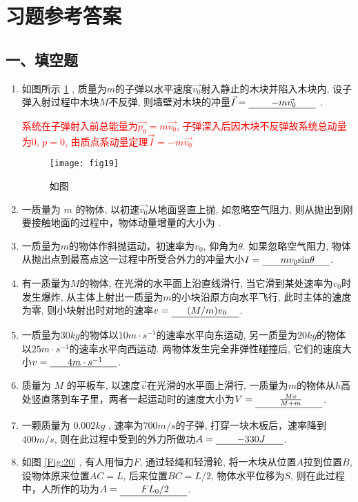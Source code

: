 \begin{enumerate}
\end{enumerate}

\section{习题参考答案}
\subsection*{一、填空题}
\begin{enumerate}
    \item 如图所示 \ref{Fig:19} , 质量为$m$的子弹以水平速度$\vec{v_0}$射入静止的木块并陷入木块内, 
    设子弹入射过程中木块$M$不反弹, 则墙壁对木块的冲量$\vec{I}=\anl{$-m\vec{v_0}$}$ .
    \begin{note}
        \textcolor{red}{系统在子弹射入前总能量为$\vec{p_0}=m\vec{v_0}$, 子弹深入后因木块不反弹故系统总动量为0, $p=0$, 由质点系动量定理$\vec{I}=-m\vec{v_0}$}
    \end{note}
    \begin{figure}[H]
        \centering
        \texttt{[image: fig19]}
            \caption{如图}\label{Fig:19}
    \end{figure}
    \item 一质量为 $m$ 的物体, 以初速$\vec{v_0}$从地面竖直上抛, 如忽略空气阻力, 则从抛出到刚要接触地面的过程中，物体动量增量的大小为 .
    \item 一质量为$m$的物体作斜抛运动，初速率为$v_0$, 仰角为$\theta$. 如果忽略空气阻力, 物体从抛出点到最高点这一过程中所受合外力的冲量大小$I=\anl{$mv_0\mathrm{sin}\theta$}$.
    \item 有一质量为$M$的物体, 在光滑的水平面上沿直线滑行, 当它滑到某处速率为$v_0$时发生爆炸, 从主体上射出一质量为$m$的小块沿原方向水平飞行, 此时主体的速度为零, 则小块射出时对地的速率$v=\anl{$(M/m)v_0$}$.
    \item 一质量为$30 kg$的物体以$10m\cdot s^{-1}$的速率水平向东运动, 另一质量为$20 kg$的物体以$25 m\cdot s^{-1}$的速率水平向西运动. 两物体发生完全非弹性碰撞后, 它们的速度大小$v=\anl{$4 m\cdot s^{-1}$}$.
    \item 质量为 $M$ 的平板车, 以速度$\vec{v}$在光滑的水平面上滑行, 一质量为$m$的物体从$h$高处竖直落到车子里，两者一起运动时的速度大小为$V=\anl{$\frac{Mv}{M+m}$}$.
    \item 一颗质量为 $0.002kg$ , 速率为$700 m/s$的子弹, 打穿一块木板后，速率降到$400 m/s$, 则在此过程中受到的外力所做功$A=\anl{$-330 J$}$.
    \item 如图 \ref{Fig:20} , 有人用恒力$F$, 通过轻绳和轻滑轮, 将一木块从位置$A$拉到位置$B$, 设物体原来位置$AC=L$, 后来位置$BC=L/2$, 物体水平位移为$S$, 则在此过程中，人所作的功为$A=\anl{$FL_0/2$}$.

\end{enumerate}
